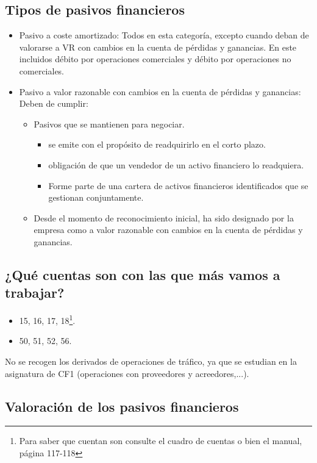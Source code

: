 \subsection{Tipos de pasivos financieros}
\begin{itemize}
    \item Pasivo a coste amortizado: Todos en esta categoría, excepto cuando deban de valorarse a VR con cambios en la cuenta de pérdidas y ganancias. En este incluidos débito por operaciones comerciales y débito por operaciones no comerciales.
    \item Pasivo a valor razonable con cambios en la cuenta de pérdidas y ganancias: Deben de cumplir:
    \begin{itemize}
        \item Pasivos que se mantienen para negociar.
        \begin{itemize}
            \item se emite con el propósito de readquirirlo en el corto plazo.
            \item obligación de que un vendedor de un activo financiero lo readquiera.
            \item Forme parte de una cartera de activos financieros identificados que se gestionan conjuntamente.
        \end{itemize}
        \item Desde el momento de reconocimiento inicial, ha sido designado por la empresa como a valor razonable con cambios en la cuenta de pérdidas y ganancias.
    \end{itemize}
\end{itemize}

\subsection{¿Qué cuentas son con las que más vamos a trabajar?}

\begin{itemize}
    \item 15, 16, 17, 18\footnote{Para saber que cuentan son consulte el cuadro de cuentas o bien el manual, página 117-118}.
    \item 50, 51, 52, 56.
\end{itemize}

No se recogen los derivados de operaciones de tráfico, ya que se estudian en la asignatura de CF1 (operaciones con proveedores y acreedores,...).

\subsection{Valoración de los pasivos financieros}


